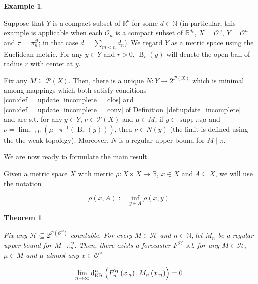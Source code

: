 \documentclass[11pt]{article}
\theoremstyle{definition}
\newtheorem{example}{Example}%
\theoremstyle{plain}
\newtheorem{theorem}{Theorem}%
\newcommand{\Nats}{\mathbb{N}}
\newcommand{\Reals}{\mathbb{R}}
\newcommand{\B}{\operatorname{B}}
\newcommand{\PM}{\mathcal{P}}
\DeclareMathOperator{\Sp}{supp}
\newcommand{\DKR}{\operatorname{d}_{\textnormal{KR}}}
\newcommand{\Ob}{\mathcal{O}}
\newcommand{\OO}{\Ob^\omega}
\newcommand{\PO}{\pi^\Ob}
\newcommand{\PMO}{\PM(\OO)}
\newcommand{\MC}{\mathcal{H}}
\begin{document}
\begin{samepage}
\begin{example}
\label{exm:update_incomplete_euclid}

Suppose that $Y$ is a compact subset of $\Reals^{d}$ for some $d \in \Nats$ (in particular, this example is applicable when each $\Ob_n$ is a compact subset of $\Reals^{d_n}$, $X=\OO$, $Y=\Ob^n$ and $\pi=\PO_n$; in that case $d=\sum_{m < n} d_n$). We regard $Y$ as a metric space using the Euclidean metric. For any $y \in Y$ and $r > 0$, $\B_r\left(y\right)$ will denote the open ball of radius $r$ with center at $y$. 

Fix any $M \subseteq \PM(X)$. Then, there is a unique $N: Y \rightarrow 2^{\PM(X)}$ which is minimal among mappings which both satisfy conditions \ref{con:def__update_incomplete__clos} and \ref{con:def__update_incomplete__conv} of Definition~\ref{def:update_incomplete} and are s.t. for any $y \in Y$, $\nu \in \PM(X)$ and $\mu \in M$, if $y \in \Sp \pi_*\mu$ and $\nu = \lim_{r \rightarrow 0}{\left(\mu \mid \pi^{-1}\left(\B_r\left(y\right)\right)\right)}$, then $\nu \in N(y)$ (the limit is defined using the the weak topology). Moreover, $N$ is a regular upper bound for $M \mid \pi$.

\end{example}
\end{samepage}

We are now ready to formulate the main result.

Given a metric space $X$ with metric $\rho: X \times X \rightarrow \Reals$, $x \in X$ and $A \subseteq X$, we will use the notation

\begin{equation}
\rho\left(x,A\right):=\inf_{y \in A} \rho\left(x,y\right)
\end{equation}

\begin{theorem}
\label{thm:main}

Fix any $\MC \subseteq 2^{\PMO}$ countable. For every $M \in \MC$ and $n \in \Nats$, let $M_n$ be a regular upper bound for $M \mid \PO_n$. Then, there exists a forecaster $F^\MC$ s.t. for any $M \in \MC$, $\mu \in M$ and $\mu$-almost any $x \in \OO$

\begin{equation}
\label{eqn:thm_main}
\lim_{n \rightarrow \infty} \DKR^n\left(F^\MC_n\left(x_{:n}\right),M_n\left(x_{:n}\right)\right) = 0
\end{equation}

\end{theorem}
\end{document}
